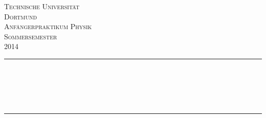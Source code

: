 \begin{titlepage}

\begin{center}

\vspace*{2cm}

\textsc{\LARGE Technische Universität\\ Dortmund}\\[1.5cm]

\textsc{\Large Anfängerpraktikum Physik\\ Sommersemester \\ 2014}\\[0.5cm]


\newcommand{\HRule}{\rule{\linewidth}{0.5mm}}
\HRule \\[0.4cm]
{ \huge \bfseries \VNr }\\[0.4cm]
{ \huge \bfseries \VN }\\[0.4cm]
{\large \bfseries \VD}\\[0.4cm]
{\Large \textsc{\Version}}
\HRule \\[1.5cm]

\begin{minipage}{0.4\textwidth}
\begin{flushleft} \large
\Namen
\end{flushleft}
\end{minipage}
\hfill
\begin{minipage}{0.4\textwidth}
\begin{flushright} \large
\Emails
\end{flushright}
\end{minipage}

\vfill



\end{center}

\end{titlepage}